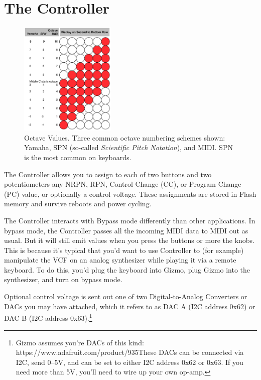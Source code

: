 \documentclass{article}
\begin{document}
\section {The Controller}
\label{controller}

\begin{figure}
\vspace{-11em}\includegraphics[width=1.8in]{octave.pdf}
\vspace{-2em}\caption{\small Octave Values.  Three common octave numbering schemes shown: Yamaha, SPN (so-called {\it Scientific Pitch Notation}), and MIDI.  SPN is the most common on keyboards.}\vspace{-1em}
\label{octave}
\end{figure}

The Controller allows you to assign to each of two buttons and two potentiometers any NRPN, RPN, Control Change (CC), or Program Change (PC) value, or optionally a control voltage.  These assignments are stored in Flash memory and survive reboots and power cycling.

The Controller interacts with Bypass mode differently than other applications.  In bypass mode, the Controller passes all the incoming MIDI data to MIDI out as usual.  But it will still emit values when you press the buttons or more the knobs.  This is because it's typical that you'd want to use Controller to (for example) manipulate the VCF on an analog synthesizer while playing it via a remote keyboard.  To do this, you'd plug the keyboard into Gizmo, plug Gizmo into the synthesizer, and turn on bypass mode.

Optional control voltage is sent out one of two Digital-to-Analog Converters or DACs you may have attached, which it refers to as DAC A (I2C address 0x62) or DAC B (I2C address 0x63).\footnote{Gizmo assumes you're DACs of this kind: https:/\!/www.adafruit.com/product/935\quad These DACs can be connected via I2C, send 0--5V, and can be set to either I2C address 0x62 or 0x63.  If you need more than 5V, you'll need to wire up your own op-amp.}
\end{document}

